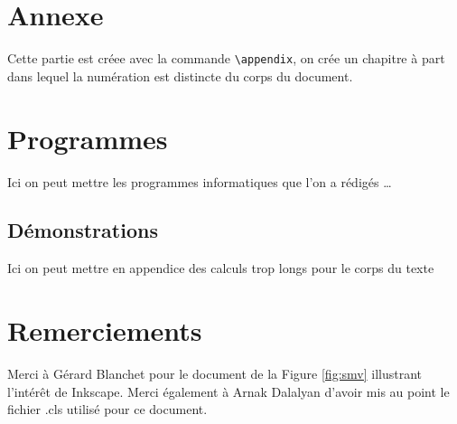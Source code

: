 \chapter{Annexe}
Cette partie est créee avec la commande \lstinline+\appendix+, 
on crée un chapitre à part dans lequel la numération est distincte du corps du document.
\chapter{Programmes}
Ici on peut mettre les programmes informatiques que l'on a rédigés \ldots
\section{Démonstrations }
Ici on peut mettre en appendice des calculs trop longs pour le corps du texte

\chapter{Remerciements}
Merci \`a G\'erard Blanchet pour le document  de la Figure \ref{fig:smv}
illustrant l'intérêt de Inkscape. Merci \'egalement \`a Arnak Dalalyan
d'avoir mis au point le fichier .cls utilisé pour ce document.